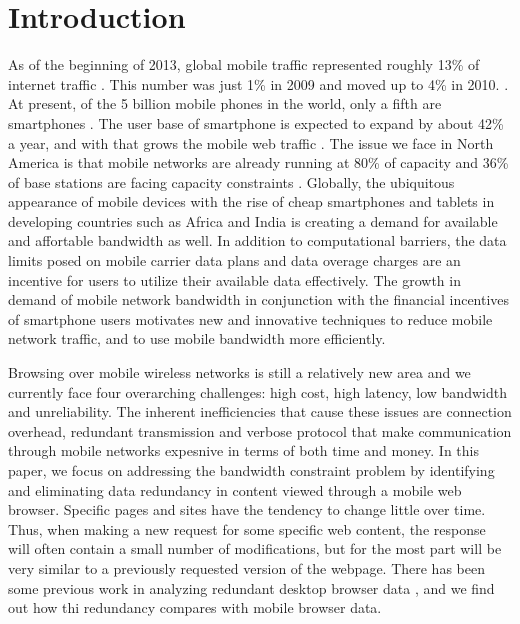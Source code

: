 \section{Introduction}
As of the beginning of 2013, global mobile traffic represented roughly 13\% of internet traffic \cite{?}. This number was just 1\% in 2009 and moved up 
to 4\% in 2010. \cite{?}. At present, of the 5 billion mobile phones in the world, only a fifth are 
smartphones \cite{?}. The user base of smartphone is expected to expand by about 42\% a year, and with that grows the mobile web traffic \cite{?}. The 
issue we face in North America is that mobile networks are already running at 80\% of capacity and 36\% of base stations are facing capacity constraints \cite{?}. Globally, the ubiquitous appearance of mobile devices with the rise of cheap smartphones and 
tablets in developing countries such as Africa and India is creating a demand for available and affortable bandwidth as well. In addition to computational 
barriers, the data limits posed on mobile carrier data plans and data overage charges are an incentive for users to utilize their available data effectively.  The growth in demand of mobile network bandwidth in conjunction with the financial incentives of smartphone users motivates new and innovative techniques 
to reduce mobile network traffic, and to use mobile bandwidth more efficiently. 

Browsing over mobile wireless networks is still a relatively new area and we currently face four overarching challenges: high cost, high latency, low 
bandwidth and unreliability. The inherent inefficiencies that cause these issues are connection overhead, redundant transmission and verbose protocol 
that make communication through mobile networks expesnive in terms of both time and money. In this paper, we focus on addressing the bandwidth constraint 
problem by identifying and eliminating data redundancy in content viewed through a mobile web browser. Specific pages and sites have the tendency to change 
little over time. Thus, when making a new request for some specific web content, the response will often contain a small number of modifications, but for the 
most part will be very similar to a previously requested version of the webpage. There has been some previous work in analyzing redundant desktop browser data 
\cite{?}, and we find out how thi redundancy compares with mobile browser data. 



